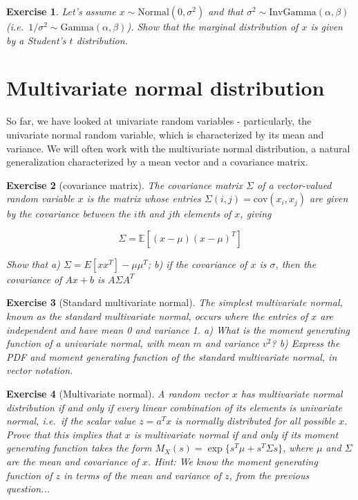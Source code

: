 \documentclass[twoside]{article}
\newcounter{lecnum}
\newtheorem{exercise}{Exercise}[lecnum]
\newcommand\E{\mathbb{E}}
\newcommand\cov{\mbox{cov}}
\begin{document}
\begin{exercise}
  Let's assume $x \sim \mbox{Normal}(0, \sigma^2)$ and that $\sigma^2\sim\mbox{InvGamma}(\alpha,\beta)$ (i.e.\ $1/\sigma^2 \sim \mbox{Gamma}(\alpha,\beta)$). Show that the marginal distribution of $x$ is given by a Student's $t$ distribution.
\end{exercise}

\section{Multivariate normal distribution}

So far, we have looked at univariate random variables - particularly, the univariate normal random variable, which is characterized by its mean and variance. We will often work with the multivariate normal distribution, a natural generalization characterized by a mean vector and a covariance matrix.

\begin{exercise}[covariance matrix]
  The covariance matrix $\Sigma$ of a vector-valued random variable $x$ is the matrix whose entries $\Sigma(i,j) = \cov(x_i,x_j)$ are given by the covariance between the $i$th and $j$th elements of $x$, giving

  $$\Sigma = \E\left[(x-\mu)(x-\mu)^T\right]$$

  Show that a) $\Sigma = E[xx^T] - \mu\mu^T$; b) if the covariance of $x$ is $\sigma$, then the covariance of $Ax+b$ is $A\Sigma A^T$
\end{exercise}

\begin{exercise}[Standard multivariate normal]
  The simplest multivariate normal, known as the standard multivariate normal, occurs where the entries of $x$ are independent and have mean 0 and variance 1. a) What is the moment generating function of a univariate normal, with mean $m$ and variance $v^2$? b) Express the PDF and moment generating function of the standard multivariate normal, in vector notation.
\end{exercise}


\begin{exercise}[Multivariate normal]
  A random vector $x$ has multivariate normal distribution if and only if every linear combination of its elements is univariate normal, i.e.\ if the scalar value $z = a^Tx$ is normally distributed for all possible $x$. Prove that this implies that $x$ is multivariate normal if and only if its moment generating function takes the form $M_X(s) = \exp\{s^T\mu + s^T\Sigma s\}$, where $\mu$ and $\Sigma$ are the mean and covariance of $x$. \textit{Hint: We know the moment generating function of $z$ in terms of the mean and variance of $z$, from the previous question...}
\end{exercise}
  
\end{document}
